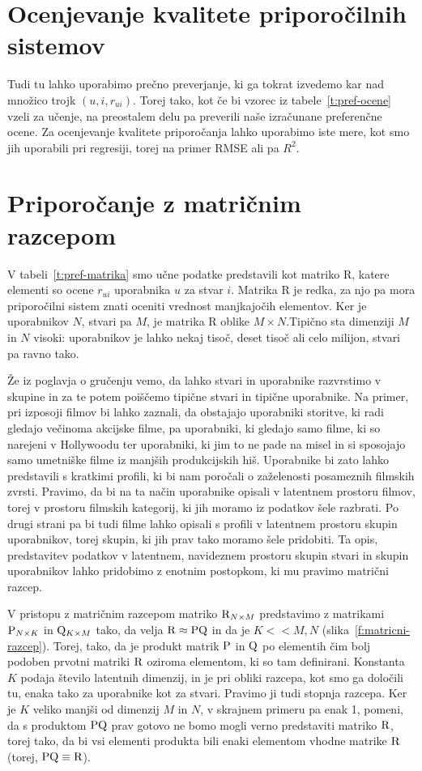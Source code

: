 \section{Ocenjevanje kvalitete priporočilnih sistemov}

Tudi tu lahko uporabimo prečno preverjanje, ki ga tokrat izvedemo kar nad množico trojk $(u,i,r_{ui})$. Torej tako, kot če bi vzorec iz tabele~\ref{t:pref-ocene} vzeli za učenje, na preostalem delu pa preverili naše izračunane preferenčne ocene. Za ocenjevanje kvalitete priporočanja lahko uporabimo iste mere, kot smo jih uporabili pri regresiji, torej na primer RMSE ali pa $R^2$.

\section{Priporočanje z matričnim razcepom}

V tabeli~\ref{t:pref-matrika} smo učne podatke predstavili kot matriko R, katere elementi so ocene $r_{ui}$ uporabnika $u$ za stvar $i$. Matrika R je redka, za njo pa mora priporočilni sistem znati oceniti vrednost manjkajočih elementov. Ker je uporabnikov $N$, stvari pa $M$, je matrika R oblike $M\times N$.Tipično sta dimenziji $M$ in $N$ visoki: uporabnikov je lahko nekaj tisoč, deset tisoč ali celo milijon, stvari pa ravno tako.

Že iz poglavja o gručenju vemo, da lahko stvari in uporabnike razvrstimo v skupine in za te potem poiščemo tipične stvari in tipične uporabnike. Na primer, pri izposoji filmov bi lahko zaznali, da obstajajo uporabniki storitve, ki radi gledajo večinoma akcijske filme, pa uporabniki, ki gledajo samo filme, ki so narejeni v Hollywoodu ter uporabniki, ki jim to ne pade na misel in si sposojajo samo umetniške filme iz manjših produkcijskih hiš. Uporabnike bi zato lahko predstavili s kratkimi profili, ki bi nam poročali o zaželenosti posameznih filmskih zvrsti. Pravimo, da bi na ta način uporabnike opisali v latentnem prostoru filmov, torej v prostoru filmskih kategorij, ki jih moramo iz podatkov šele razbrati. Po drugi strani pa bi tudi filme lahko opisali s profili v latentnem prostoru skupin uporabnikov, torej skupin, ki jih prav tako moramo šele pridobiti. Ta opis, predstavitev podatkov v latentnem, navideznem prostoru skupin stvari in skupin uporabnikov lahko pridobimo z enotnim postopkom, ki mu pravimo matrični razcep.

V pristopu z matričnim razcepom matriko ${\rm R}_{N\times M}$ predstavimo z matrikami ${\rm P}_{N\times K}$ in ${\rm Q}_{K\times M}$ tako, da velja ${\rm R}\approx {\rm P}{\rm Q}$ in da je $K<<M, N$ (slika~\ref{f:matricni-razcep}). Torej, tako, da je produkt matrik ${\rm P}$ in ${\rm Q}$ po elementih čim bolj podoben prvotni matriki ${\rm R}$ oziroma elementom, ki so tam definirani. Konstanta $K$ podaja število latentnih dimenzij, in je pri obliki razcepa, kot smo ga določili tu, enaka tako za uporabnike kot za stvari. Pravimo ji tudi stopnja razcepa. Ker je $K$ veliko manjši od dimenzij $M$ in $N$, v skrajnem primeru pa enak 1, pomeni, da s produktom ${\rm P} {\rm Q}$ prav gotovo ne bomo mogli verno predstaviti matriko $\rm R$, torej tako, da bi vsi elementi produkta bili enaki elementom vhodne matrike $\rm R$ (torej, ${\rm P}{\rm Q}\equiv {\rm R}$).

